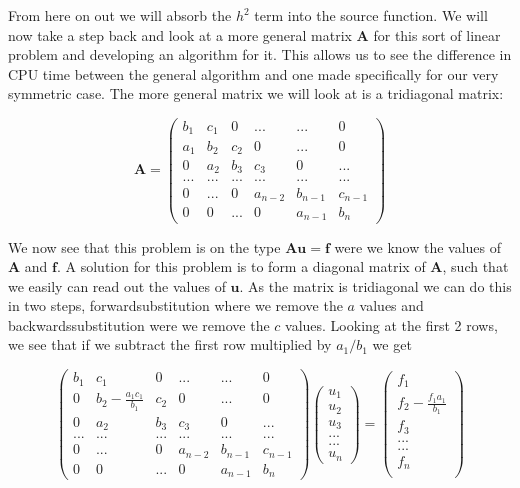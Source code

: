 \documentclass[a4paper,11pt]{article}
\begin{document}
{From here on out we will absorb the $h^2$ term into the source function. We will now take a step back and look at a more general matrix $\mathbf{A}$ for this sort of linear problem and developing an algorithm for it. This allows us to see the difference in CPU time between the general algorithm and one made specifically for our very symmetric case. The more general matrix we will look at is a tridiagonal matrix:
		
\begin{equation}
\mathbf{A} = \begin{pmatrix}
b_1 & c_1 & 0 & ... & ... & 0 \\
a_1 & b_2 & c_2 & 0 & ... & 0 \\
0 & a_2 & b_3 & c_3 & 0 & ... \\
... & ... & ... & ... & ... & ... \\
0 & ... & 0 & a_{n-2} & b_{n-1} & c_{n-1} \\
0 & 0 & ... & 0 & a_{n-1} & b_{n} 
\end{pmatrix}
\label{general_tridiagonal_matrix}
\end{equation}
		
We now see that this problem is on the type $\mathbf{A}\mathbf{u}=\mathbf{f}$ were we know the values of $\mathbf{A}$ and $\mathbf{f}$. A solution for this problem is to form a diagonal matrix of $\mathbf{A}$, such that we easily can read out the values of $\mathbf{u}$. As the matrix is tridiagonal we can do this in two steps, forwardsubstitution where we remove the $a$ values and backwardssubstitution were we remove the $c$ values. Looking at the first 2 rows, we see that if we subtract the first row multiplied by $a_1/b_1$ we get
		
\begin{equation}
\begin{pmatrix}
b_1 & c_1 & 0 & ... & ... & 0 \\
0 & b_2-\frac{a_1 c_1}{b_1} & c_2 & 0 & ... & 0 \\
0 & a_2 & b_3 & c_3 & 0 & ... \\
... & ... & ... & ... & ... & ... \\
0 & ... & 0 & a_{n-2} & b_{n-1} & c_{n-1} \\
0 & 0 & ... & 0 & a_{n-1} & b_{n} 
\end{pmatrix} \begin{pmatrix}
u_1\\
u_2\\
u_3\\
...\\
...\\
u_n
\end{pmatrix} = \begin{pmatrix}
f_1 \\
f_2-\frac{f_1 a_1}{b_1} \\
f_3 \\
... \\
... \\
f_n \\
\end{pmatrix}
\end{equation}
		
}
\end{document}
